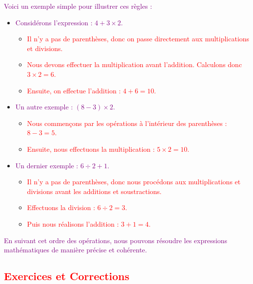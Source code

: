 \documentclass{article}
\begin{document}
\vspace{0.25cm}

\textcolor{purple}{Voici un exemple simple pour illustrer ces règles :}

\begin{itemize}
    \item \textcolor{purple}{Considérons l'expression : \( 4 + 3 \times 2 \).}
    \begin{itemize}
        \item \textcolor{red}{Il n'y a pas de parenthèses, donc on passe directement aux multiplications et divisions.}
        \item \textcolor{red}{Nous devons effectuer la multiplication avant l'addition. Calculons donc \( 3 \times 2 = 6 \).}
        \item \textcolor{red}{Ensuite, on effectue l'addition : \( 4 + 6 = 10 \).}
    \end{itemize}

    \item \textcolor{purple}{Un autre exemple : \( (8 - 3) \times 2 \).}
    \begin{itemize}
        \item \textcolor{red}{Nous commençons par les opérations à l'intérieur des parenthèses : \( 8 - 3 = 5 \).}
        \item \textcolor{red}{Ensuite, nous effectuons la multiplication : \( 5 \times 2 = 10 \).}
    \end{itemize}

    \item \textcolor{purple}{Un dernier exemple : \( 6 \div 2 + 1 \).}
    \begin{itemize}
        \item \textcolor{red}{Il n'y a pas de parenthèses, donc nous procédons aux multiplications et divisions avant les additions et soustractions.}
        \item \textcolor{red}{Effectuons la division : \( 6 \div 2 = 3 \).}
        \item \textcolor{red}{Puis nous réalisons l'addition : \( 3 + 1 = 4 \).}
    \end{itemize}
\end{itemize}

\textcolor{purple}{En suivant cet ordre des opérations, nous pouvons résoudre les expressions mathématiques de manière précise et cohérente.}

\subsection{\textcolor{red}{Exercices et Corrections}}
\end{document}
